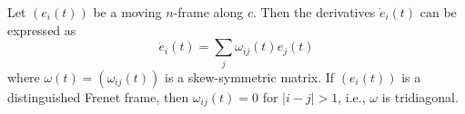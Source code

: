 Let $(e_i(t))$ be a moving $n$-frame along $c$. Then the derivatives $\dot{e}_i(t)$ can be expressed as
$$\dot{e}_i(t) = \sum_j \omega_{ij}(t) e_j(t)$$
where $\omega(t) = (\omega_{ij}(t))$ is a skew-symmetric matrix. If $(e_i(t))$ is a distinguished Frenet frame, then $\omega_{ij}(t) = 0$ for $|i - j| > 1$, i.e., $\omega$ is tridiagonal.